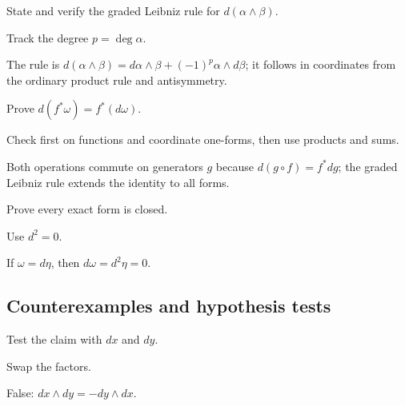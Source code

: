 \begin{exercise}\label{exr:vii09-ped-07}
State and verify the graded Leibniz rule for \(d(\alpha\wedge\beta)\).
\end{exercise}
\begin{hint}
Track the degree \(p=\deg\alpha\).
\end{hint}
\begin{solution}
The rule is \(d(\alpha\wedge\beta)=d\alpha\wedge\beta+(-1)^p\alpha\wedge d\beta\); it follows in coordinates from the ordinary product rule and antisymmetry.
\end{solution}

\begin{exercise}\label{exr:vii09-ped-08}
Prove \(d(f^*\omega)=f^*(d\omega)\).
\end{exercise}
\begin{hint}
Check first on functions and coordinate one-forms, then use products and sums.
\end{hint}
\begin{solution}
Both operations commute on generators \(g\) because \(d(g\circ f)=f^*dg\); the graded Leibniz rule extends the identity to all forms.
\end{solution}

\begin{exercise}\label{exr:vii09-ped-09}
Prove every exact form is closed.
\end{exercise}
\begin{hint}
Use \(d^2=0\).
\end{hint}
\begin{solution}
If \(\omega=d\eta\), then \(d\omega=d^2\eta=0\).
\end{solution}

\subsection*{Counterexamples and hypothesis tests}

\begin{exercise}\label{exr:vii09-ped-10}
Test the claim with \(dx\) and \(dy\).
\end{exercise}
\begin{hint}
Swap the factors.
\end{hint}
\begin{solution}
False: \(dx\wedge dy=-dy\wedge dx\).
\end{solution}

